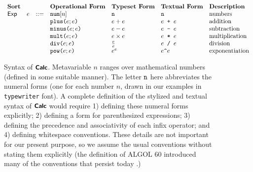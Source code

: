 \begin{figure}
\hspace{-5px}$\begin{array}{lrlllll}
\textbf{Sort} & & & \textbf{Operational Form} & \textbf{Typeset Form} & \textbf{Textual Form} & \textbf{Description}\\
\mathsf{Exp} & e & ::= & \anumintro{n} & \numintro{n} & \numintro{n} & \text{numbers}\\
&&& \aplus{e}{e} & e + e & e\texttt{ + }e & \text{addition} \\
&&& \aminus{e}{e} & e - e & e\texttt{ - }e & \text{subtraction}\\
&&& \amult{e}{e} & e \times e & e\texttt{ * }e & \text{multiplication}\\
&&& \adiv{e}{e} & \frac{e}{e} & e\texttt{ / }e & \text{division}\\
&&& \apow{e}{e} & {e}^{e} & e\verb|^|e & \text{exponentiation}
\end{array}$
\caption[Syntax of $\simplelang$]{Syntax of $\simplelang$. Metavariable $n$ ranges over mathematical numbers (defined in some suitable manner). The letter $\texttt{n}$ here abbreviates the numeral forms (one for each number $n$, drawn in our examples in \texttt{typewriter} font). A complete definition of the stylized and textual syntax of $\simplelang$ would require 1) defining these numeral forms explicitly; 2) defining a form for parenthesized expressions; 3) defining the precedence and associativity of each infix operator; and 4) defining whitespace conventions. These details are not important for our present purpose, so we assume the usual conventions without stating them explicitly (the definition of ALGOL 60 introduced many of the conventions that persist today \cite{naur1963revised}.)}
\label{fig:simple-example}
\end{figure}

